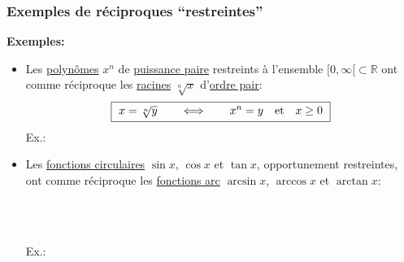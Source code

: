 \documentclass[10pt]{beamer}
\newcommand{\bitem}{\item[$\bullet$]}
\newcommand{\R}{\mathbb R}
\begin{document}
\begin{frame}
\frametitle{\bf Exemples de r\'eciproques ``restreintes''}
\medskip 

{\small 
{\bf Exemples:}
\begin{itemize}
\bitem
Les \underline{polyn\^omes} $x^n$ de \underline{puissance paire} 
restreints \`a l'ensemble $[0,\infty[ \subset \R$ ont comme 
r\'eciproque les \underline{racines} $\sqrt[n]{x}$ d'\underline{ordre pair}:
$$
\mbox{\framebox{\ $x=\sqrt[n]{y} \qquad\Longleftrightarrow\qquad 
x^n=y \quad \mbox{et}\quad x\geq 0 $\ }}
$$
Ex.:\quad 
\raisebox{-.5\height}{\grapheXXTOT \quad \grapheXXRED \quad \grapheSQRT}

\pause
\bitem
Les \underline{fonctions circulaires} $\sin x$, $\cos x$ et $\tan x$, 
opportunement restreintes, ont comme r\'eciproque les 
\underline{fonctions arc} $\arcsin x$, $\arccos x$ et $\arctan x$:  
\begin{center}
\\ 
\\  
\framebox{\ $x=\arctan{y} \qquad\Longleftrightarrow\qquad 
\tan x =y \quad \mbox{et}\quad x\in ]-\pi/2,\pi/2[$\ } 
\end{center}
Ex.:\quad 
\raisebox{-.5\height}{\grapheSINTOT \quad \grapheSINRED \quad \grapheASINRED}
\end{itemize}

}

\end{frame}

\end{document}
